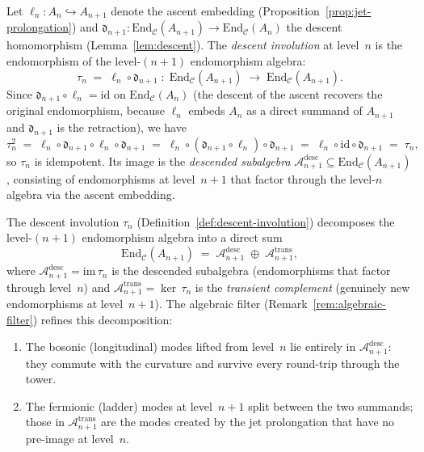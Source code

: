 
\begin{definition}
\label{def:descent-involution}
Let $\ell_n \colon A_n \hookrightarrow A_{n+1}$ denote the ascent embedding
(Proposition~\ref{prop:jet-prolongation}) and
$\mathfrak{d}_{n+1} \colon \mathrm{End}_{\mathcal{C}}(A_{n+1}) \to
\mathrm{End}_{\mathcal{C}}(A_n)$ the descent homomorphism
(Lemma~\ref{lem:descent}).  The \emph{descent involution} at level~$n$ is
the endomorphism of the level-$(n{+}1)$ endomorphism algebra:
\[
  \tau_n \;=\; \ell_n \circ \mathfrak{d}_{n+1}
  \;\colon\;
  \mathrm{End}_{\mathcal{C}}(A_{n+1})
  \;\longrightarrow\;
  \mathrm{End}_{\mathcal{C}}(A_{n+1}).
\]
Since $\mathfrak{d}_{n+1} \circ \ell_n = \mathrm{id}$ on
$\mathrm{End}_{\mathcal{C}}(A_n)$ (the descent of the ascent recovers the
original endomorphism, because $\ell_n$ embeds $A_n$ as a direct summand of
$A_{n+1}$ and $\mathfrak{d}_{n+1}$ is the retraction), we have
\[
  \tau_n^2
  \;=\;
  \ell_n \circ \mathfrak{d}_{n+1} \circ \ell_n \circ \mathfrak{d}_{n+1}
  \;=\;
  \ell_n \circ (\mathfrak{d}_{n+1} \circ \ell_n) \circ \mathfrak{d}_{n+1}
  \;=\;
  \ell_n \circ \mathrm{id} \circ \mathfrak{d}_{n+1}
  \;=\;
  \tau_n,
\]
so $\tau_n$ is idempotent.  Its image is the
\emph{descended subalgebra} $\mathcal{A}_{n+1}^{\mathrm{desc}} \subseteq
\mathrm{End}_{\mathcal{C}}(A_{n+1})$, consisting of endomorphisms at
level~$n{+}1$ that factor through the level-$n$ algebra via the ascent
embedding.
\end{definition}

\begin{proposition}
\label{prop:descent-eigenspaces}
The descent involution $\tau_n$ (Definition~\ref{def:descent-involution})
decomposes the level-$(n{+}1)$ endomorphism algebra into a direct sum
\[
  \mathrm{End}_{\mathcal{C}}(A_{n+1})
  \;=\;
  \mathcal{A}_{n+1}^{\mathrm{desc}} \;\oplus\; \mathcal{A}_{n+1}^{\mathrm{trans}},
\]
where $\mathcal{A}_{n+1}^{\mathrm{desc}} = \mathrm{im}\,\tau_n$ is the
descended subalgebra (endomorphisms that factor through level~$n$) and
$\mathcal{A}_{n+1}^{\mathrm{trans}} = \ker\,\tau_n$ is the \emph{transient
complement} (genuinely new endomorphisms at level~$n{+}1$).  The algebraic filter
(Remark~\ref{rem:algebraic-filter}) refines this decomposition:
\begin{enumerate}
  \item The bosonic (longitudinal) modes lifted from level~$n$ lie entirely in
        $\mathcal{A}_{n+1}^{\mathrm{desc}}$: they commute with the curvature
        and survive every round-trip through the tower.
  \item The fermionic (ladder) modes at level~$n{+}1$ split between the two
        summands; those in $\mathcal{A}_{n+1}^{\mathrm{trans}}$ are the modes
        created by the jet prolongation that have no pre-image at level~$n$.
\end{enumerate}
\end{proposition}

